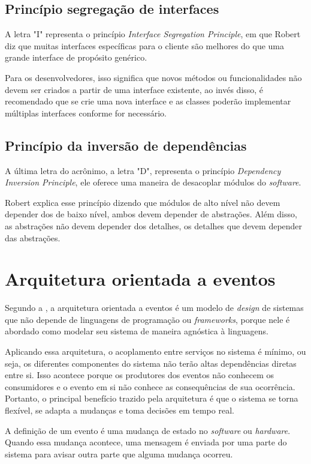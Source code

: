 \subsection{Princípio segregação de interfaces}
A letra "I" representa o princípio \textit{Interface Segregation Principle}, em que Robert diz que muitas interfaces específicas para o cliente são melhores do que uma grande interface de propósito genérico.

Para os desenvolvedores, isso significa que novos métodos ou funcionalidades não devem ser criados a partir de uma interface existente, ao invés disso, é recomendado que se crie uma nova interface e as classes poderão implementar múltiplas interfaces conforme for necessário.

\subsection{Princípio da inversão de dependências}\label{sec:D}
A última letra do acrônimo, a letra "D", representa o princípio \textit{Dependency Inversion Principle}, ele oferece uma maneira de desacoplar módulos do \textit{software}.

Robert explica esse princípio dizendo que módulos de alto nível não devem depender dos de baixo nível, ambos devem depender de abstrações. Além disso, as abstrações não devem depender dos detalhes, os detalhes que devem depender das abstrações.

\section{Arquitetura orientada a eventos}\label{sec:eventos}
Segundo a \textcite{redhat}, a arquitetura orientada a eventos é um modelo de \textit{design} de sistemas que não depende de linguagens de programação ou \textit{frameworks}, porque nele é abordado como modelar seu sistema de maneira agnóstica à linguagens.

Aplicando essa arquitetura, o acoplamento entre serviços no sistema é mínimo, ou seja, os diferentes componentes do sistema não terão altas dependências diretas entre si. Isso acontece porque os produtores dos eventos não conhecem os consumidores e o evento em si não conhece as consequências de sua ocorrência. Portanto, o principal benefício trazido pela arquitetura é que o sistema se torna flexível, se adapta a mudanças e toma decisões em tempo real.

A definição de um evento é uma mudança de estado no \textit{software} ou \textit{hardware}. Quando essa mudança acontece, uma mensagem é enviada por uma parte do sistema para avisar outra parte que alguma mudança ocorreu.

